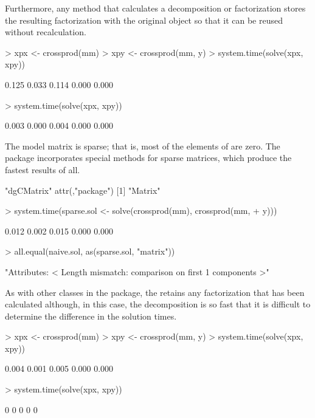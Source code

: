 \documentclass{article}
\begin{document}
Furthermore, any method that calculates a
decomposition or factorization stores the resulting factorization with
the original object so that it can be reused without recalculation.
\begin{Schunk}
\begin{Sinput}
> xpx <- crossprod(mm)
> xpy <- crossprod(mm, y)
> system.time(solve(xpx, xpy))
\end{Sinput}
\begin{Soutput}
[1] 0.125 0.033 0.114 0.000 0.000
\end{Soutput}
\begin{Sinput}
> system.time(solve(xpx, xpy))
\end{Sinput}
\begin{Soutput}
[1] 0.003 0.000 0.004 0.000 0.000
\end{Soutput}
\end{Schunk}

The model matrix  is sparse; that is, most of the elements of
 are zero.  The  package incorporates special
methods for sparse matrices, which produce the fastest results of all.

\begin{Schunk}
\begin{Soutput}
[1] "dgCMatrix"
attr(,"package")
[1] "Matrix"
\end{Soutput}
\begin{Sinput}
> system.time(sparse.sol <- solve(crossprod(mm), crossprod(mm, 
+     y)))
\end{Sinput}
\begin{Soutput}
[1] 0.012 0.002 0.015 0.000 0.000
\end{Soutput}
\begin{Sinput}
> all.equal(naive.sol, as(sparse.sol, "matrix"))
\end{Sinput}
\begin{Soutput}
[1] "Attributes: < Length mismatch: comparison on first 1 components >"
\end{Soutput}
\end{Schunk}

As with other classes in the  package, the
 retains any factorization that has been calculated
although, in this case, the decomposition is so fast that it is
difficult to determine the difference in the solution times.

\begin{Schunk}
\begin{Sinput}
> xpx <- crossprod(mm)
> xpy <- crossprod(mm, y)
> system.time(solve(xpx, xpy))
\end{Sinput}
\begin{Soutput}
[1] 0.004 0.001 0.005 0.000 0.000
\end{Soutput}
\begin{Sinput}
> system.time(solve(xpx, xpy))
\end{Sinput}
\begin{Soutput}
[1] 0 0 0 0 0
\end{Soutput}
\end{Schunk}


\end{document}
